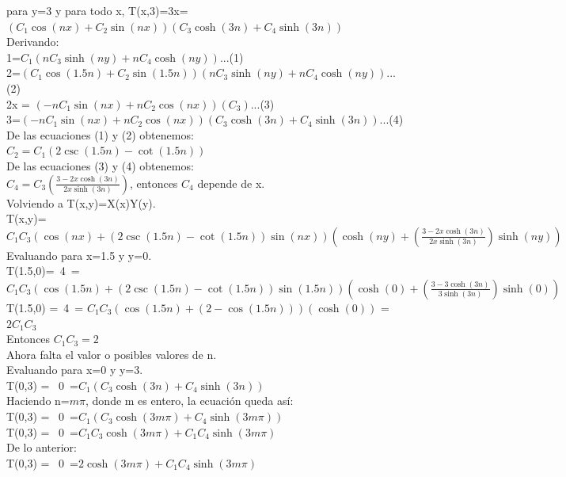\documentclass[11pt,a4paper]{article}
\begin{document}
para y=3 y para todo x, T(x,3)=3x=$\left( C_1 \cos(nx)+C_2 \sin(nx)\right) \left(C_3 \cosh(3n)+C_4 \sinh(3n)\right) $\\
Derivando:\\
1=$C_1\left( nC_3 \sinh(ny)+nC_4 \cosh(ny)\right) $...(1)\\
2=$\left( C_1 \cos(1.5n)+C_2 \sin(1.5n)\right)\left( nC_3 \sinh(ny)+nC_4 \cosh(ny)\right) $...(2)\\
2x = $\left(- nC_1 \sin(nx)+ nC_2 \cos(nx)\right)( C_3)  $...(3)\\
3=$\left(- nC_1 \sin(nx)+ nC_2 \cos(nx)\right) \left(C_3 \cosh(3n)+C_4 \sinh(3n)\right) $...(4)\\
De las ecuaciones (1) y (2) obtenemos:\\
$C_2 = C_1 \left( 2\csc(1.5n) - \cot(1.5n)\right)$\\
De las ecuaciones (3) y (4) obtenemos:\\
$C_4 = C_3 \left( \frac{3-2x\cosh(3n)}{2x\sinh(3n)}\right)$, entonces $C_4$ depende de x.\\Volviendo a T(x,y)=X(x)Y(y).\\
T(x,y)=$C_1C_3\left( \cos(nx)+ \left(2\csc(1.5n) - \cot(1.5n)\right) \sin(nx)\right) \left(\cosh(ny)+\left( \frac{3-2x\cosh(3n)}{2x\sinh(3n)}\right) \sinh(ny)\right) $\\
Evaluando para x=1.5 y y=0.\\
T(1.5,0)=~4~=$C_1C_3\left( \cos(1.5n)+ \left(2\csc(1.5n) - \cot(1.5n)\right) \sin(1.5n)\right) \left(\cosh(0)+\left( \frac{3-3\cosh(3n)}{3\sinh(3n)}\right) \sinh(0)\right) $\\T(1.5,0) =~4~= $ C_1C_3\left( \cos(1.5n)+ \left(2 - \cos(1.5n)\right)\right) \left(\cosh(0)\right) $ = $ 2C_1C_3 $ \\Entonces $C_1 C_3 = 2$\\
Ahora falta el valor o posibles valores de n.\\
Evaluando para x=0 y y=3.\\
T(0,3) = ~0~=$ C_1 \left(C_3 \cosh(3n)+C_4 \sinh(3n)\right) $\\
Haciendo n=$m\pi$, donde m es entero, la ecuación queda así:\\
T(0,3) = ~0~=$ C_1 \left(C_3 \cosh(3m\pi)+C_4 \sinh(3m \pi)\right) $\\
T(0,3) = ~0~=$ C_1 C_3 \cosh(3m\pi)+C_1 C_4 \sinh(3m \pi) $\\
De lo anterior:\\
T(0,3) = ~0~=$ 2 \cosh(3m\pi)+C_1 C_4 \sinh(3m \pi) $\\
\end{document}
